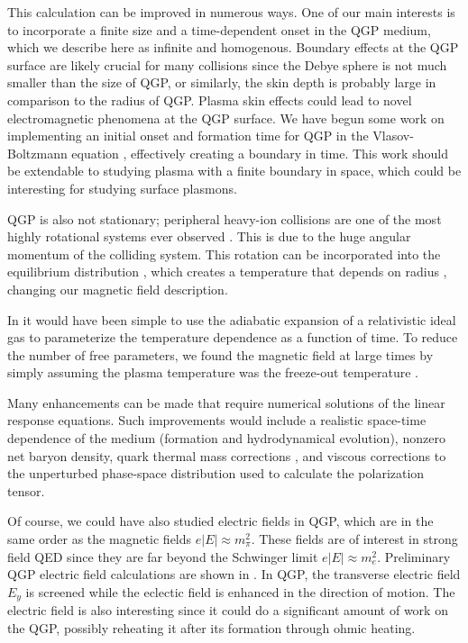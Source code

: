 This calculation can be improved in numerous ways. One of our main interests is to incorporate a finite size and a time-dependent onset in the QGP medium, which we describe here as infinite and homogenous. Boundary effects at the QGP surface are likely crucial for many collisions since the Debye sphere is not much smaller than the size of QGP, or similarly, the skin depth is probably large in comparison to the radius of QGP. Plasma skin effects could lead to novel electromagnetic phenomena at the QGP surface. We have begun some work on implementing an initial onset and formation time for QGP in the Vlasov-Boltzmann equation , effectively creating a boundary in time. This work should be extendable to studying plasma with a finite boundary in space, which could be interesting for studying surface plasmons.

QGP is also not stationary; peripheral heavy-ion collisions are one of the most highly rotational systems ever observed \cite{Csernai:2013bq,Deng:2016vhi,Jiang:2016woz,Becattini:2020pvq}. This is due to the huge angular momentum of the colliding system. This rotation can be incorporated into the equilibrium distribution \cite{Hakim:2011bk}, which creates a temperature that depends on radius \cite{Chernikov:1964edr}, changing our magnetic field description.

In \cite{Grayson:2022asf} it would have been simple to use the adiabatic expansion of a relativistic ideal gas \cite{Bjorken:1982qr} to parameterize the temperature dependence as a function of time. To reduce the number of free parameters, we found the magnetic field at large times by simply assuming the plasma temperature was the freeze-out temperature .

Many enhancements can be made that require numerical solutions of the linear response equations. Such improvements would include a realistic space-time dependence of the medium (formation and hydrodynamical evolution), nonzero net baryon density, quark thermal mass corrections \cite{Weldon:1982bn}, and viscous corrections to the unperturbed phase-space distribution used to calculate the polarization tensor.

Of course, we could have also studied electric fields in QGP, which are in the same order as the magnetic fields $e|E| \approx m_\pi^2$. These fields are of interest in strong field QED since they are far beyond the Schwinger limit $e|E| \approx m_e^2$. Preliminary QGP electric field calculations are shown in . In QGP, the transverse electric field $E_y$ is screened while the eclectic field is enhanced in the direction of motion. The electric field is also interesting since it could do a significant amount of work on the QGP, possibly reheating it after its formation through ohmic heating. 

